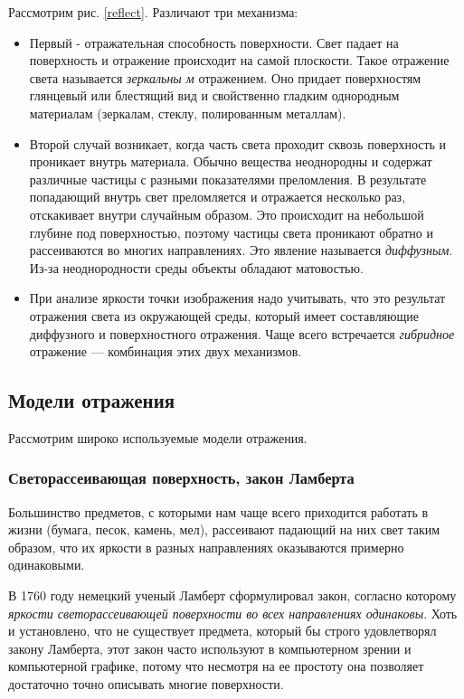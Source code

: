 \documentclass[12pt]{article}
\begin{document}
Рассмотрим рис. \eqref{reflect}. Различают три механизма:
\begin{itemize}
  \item Первый - отражательная способность поверхности. Свет падает на поверхность
        и отражение происходит на самой плоскости. Такое отражение света называется
        \textit{зеркальны м} отражением. Оно придает поверхностям глянцевый или блестящий
        вид и свойственно гладким однородным материалам (зеркалам, стеклу, полированным металлам).
  \item Второй случай возникает, когда часть света проходит сквозь поверхность
        и проникает внутрь материала. Обычно вещества неоднородны и содержат различные
        частицы с разными показателями преломления. В результате попадающий внутрь свет
        преломляется и отражается несколько раз, отскакивает внутри случайным образом.
        Это происходит на небольшой глубине под поверхностью, поэтому частицы света
        проникают обратно и рассеиваются во многих направлениях.
        Это явление называется \textit{диффузным}. Из-за неоднородности среды
        объекты обладают матовостью.
  \item При анализе яркости точки изображения надо учитывать, что это результат отражения света из окружающей среды, который имеет составляющие
        диффузного и поверхностного отражения. Чаще всего встречается \textit{гибридное} отражение — комбинация этих двух механизмов.
\end{itemize}

\subsection{Модели отражения}

Рассмотрим широко используемые модели отражения.

\subsubsection{Светорассеивающая поверхность, закон Ламберта}

Большинство предметов, с которыми нам чаще всего приходится работать в жизни
(бумага, песок, камень, мел), рассеивают падающий на них свет таким образом,
что их яркости в разных направлениях оказываются примерно одинаковыми.

В 1760 году немецкий ученый Ламберт сформулировал закон, согласно которому
\textit{яркости светорассеивающей поверхности во всех направлениях одинаковы}.
Хоть и установлено, что не существует предмета, который бы строго удовлетворял
закону Ламберта, этот закон часто используют в компьютерном зрении и
компьютерной графике, потому что несмотря на ее простоту она
позволяет достаточно точно описывать многие поверхности.
\end{document}
